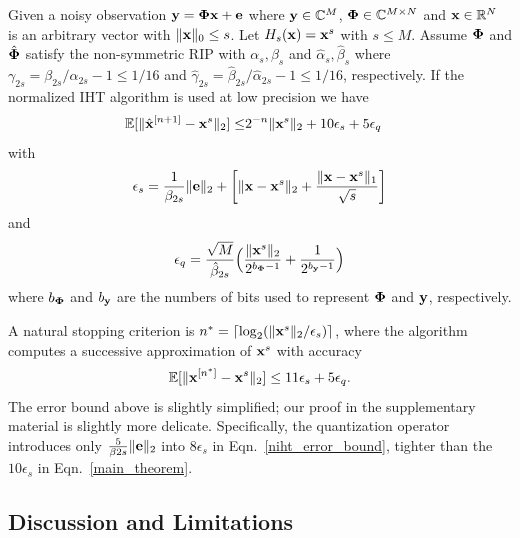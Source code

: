 \documentclass[aoas,preprint]{imsart}
\numberwithin{equation}{section}
\theoremstyle{plain}
\begin{document}
\begin{theorem}\label{main_theorem_TH}
Given a noisy observation ${\bf y} = {\bf \Phi x}+{\bf e} $ where ${\bf y} \in \mathbb{C}^M$, ${\bf \Phi} \in \mathbb{C}^{M\times N}$ and ${\bf x} \in \mathbb{R}^N$ is an arbitrary vector with $\|{\bf x} \|_0 \leq s$. Let $H_s({\bf x}) = {\bf x}^s$ with $s\leq M$. Assume ${\bf \Phi}$ and $\hat{\bf \Phi}$ satisfy the non-symmetric RIP with ${\alpha}_s, {\beta}_s$ and $\hat{\alpha}_s, \hat{\beta}_s$ where ${\gamma}_{2s} = {\beta}_{2s}/{\alpha}_{2s} -1 \leq 1/16$ and $\hat{\gamma}_{2s} = \hat{\beta}_{2s}/\hat{\alpha}_{2s} -1 \leq 1/16$, respectively. If the normalized IHT algorithm is used at low precision we have
\begin{equation}\label{main_theorem}
\begin{split}
        \mathbb{E}[\|\hat{{\bf x}}^{[n+1]}-{\bf x}^s\|_2]  
        \leq &2^{-n}\|{\bf x}^{s}\|_2  + 10 {\epsilon}_s + 5 {\epsilon}_q
\end{split}
\end{equation}
with 
\begin{equation}
 {\epsilon}_s = \frac{1}{\beta_{2s}}\|{\bf e} \|_2 +\bigg  [ \|{\bf x}-{\bf x}^s \|_2 + \frac{\|{\bf x}-{\bf x}^s \|_1}{\sqrt{s}}\bigg]    
\end{equation}
and
\begin{equation}
 {\epsilon}_q = \frac{\sqrt{M}}{\hat{\beta}_{2s}}\Big ( \frac{\| {\bf x}^s\|_2}{2^{b_{\bf \Phi}-1}}+\frac{1}{2^{b_{\bf y}-1}} \Big )
\end{equation}
where $b_{\bf \Phi}$ and $b_{\bf y}$ are the numbers of bits used to represent ${\bf \Phi}$ and ${\bf y}$, respectively.
\end{theorem}
A natural stopping criterion is $n^* = \lceil \log_2 (\|{\bf x}^s \|_2/\epsilon_s)\rceil$, where the algorithm computes a successive approximation of ${\bf x}^s$ with accuracy
\begin{equation}
    \mathbb{E}[\|{\bf x}^{[n^*]}-{\bf x}^s \|_2] \leq 11\epsilon_s + 5\epsilon_q.
\end{equation}
The error bound above is slightly simplified; our proof in the supplementary material is slightly more delicate. Specifically, the quantization operator introduces only $\frac{5}{\beta
{2s}} \|{\bf e} \|_2$ into $8 {\epsilon}_s$ in Eqn.~\ref{niht_error_bound}, tighter than the $10 {\epsilon}_s$ in Eqn.~\ref{main_theorem}.

\subsection{Discussion and Limitations}
\end{document}
